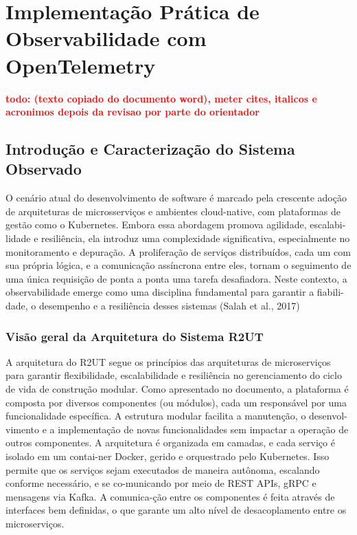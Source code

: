 
\chapter{Implementação Prática de Observabilidade com OpenTelemetry}

\textbf{\textcolor{red}{todo: (texto copiado do documento word), meter cites, italicos e acronimos depois da revisao por parte do orientador}}

\section{Introdução e Caracterização do Sistema Observado}

O cenário atual do desenvolvimento de software é marcado pela crescente adoção de arquiteturas de microsserviços e ambientes cloud-native, com plataformas de gestão como o Kubernetes. Embora essa abordagem promova agilidade, escalabi-lidade e resiliência, ela introduz uma complexidade significativa, especialmente no monitoramento e depuração. A proliferação de serviços distribuídos, cada um com sua própria lógica, e a comunicação assíncrona entre eles, tornam o seguimento de uma única requisição de ponta a ponta uma tarefa desafiadora. Neste contexto, a observabilidade emerge como uma disciplina fundamental para garantir a fiabili-dade, o desempenho e a resiliência desses sistemas (Salah et al., 2017)

\subsection{Visão geral da Arquitetura do Sistema R2UT}

A arquitetura do R2UT segue os princípios das arquiteturas de microserviços para garantir flexibilidade, escalabilidade e resiliência no gerenciamento do ciclo de vida de construção modular. Como apresentado no documento, a plataforma é composta por diversos componentes (ou módulos), cada um responsável por uma funcionalidade específica. A estrutura modular facilita a manutenção, o desenvol-vimento e a implementação de novas funcionalidades sem impactar a operação de outros componentes.
A arquitetura é organizada em camadas, e cada serviço é isolado em um contai-ner Docker, gerido e orquestrado pelo Kubernetes. Isso permite que os serviços sejam executados de maneira autônoma, escalando conforme necessário, e se co-municando por meio de REST APIs, gRPC e mensagens via Kafka. A comunica-ção entre os componentes é feita através de interfaces bem definidas, o que garante um alto nível de desacoplamento entre os microserviços.


